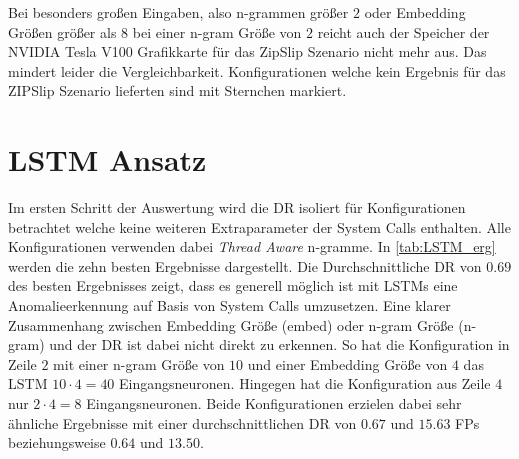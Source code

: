     Bei besonders großen Eingaben, also n-grammen größer $2$ oder Embedding Größen größer als $8$ bei einer n-gram Größe von $2$ reicht auch der Speicher der NVIDIA Tesla V100 Grafikkarte für das ZipSlip Szenario nicht mehr aus.
    Das mindert leider die Vergleichbarkeit.
    Konfigurationen welche kein Ergebnis für das ZIPSlip Szenario lieferten sind mit Sternchen markiert.


    
\section{LSTM Ansatz}\label{sec:erg_LSTM}
    Im ersten Schritt der Auswertung wird die \ac{DR} isoliert für Konfigurationen betrachtet welche keine weiteren Extraparameter der System Calls enthalten.
    Alle Konfigurationen verwenden dabei \textit{Thread Aware} n-gramme.
    In \autoref{tab:LSTM_erg} werden die zehn besten Ergebnisse dargestellt.
    Die Durchschnittliche \ac{DR} von $0.69$ des besten Ergebnisses zeigt, dass es generell möglich ist mit \acp{LSTM} eine Anomalieerkennung auf Basis von System Calls umzusetzen.
    Eine klarer Zusammenhang zwischen Embedding Größe (embed) oder n-gram Größe (n-gram) und der \ac{DR} ist dabei nicht direkt zu erkennen.
    So hat die Konfiguration in Zeile $2$ mit einer n-gram Größe von $10$ und einer Embedding Größe von $4$ das \ac{LSTM} $10 \cdot 4=40$ Eingangsneuronen.
    Hingegen hat die Konfiguration aus Zeile $4$ nur $2 \cdot 4 = 8$ Eingangsneuronen.
    Beide Konfigurationen erzielen dabei sehr ähnliche Ergebnisse mit einer durchschnittlichen \ac{DR} von $0.67$ und $15.63$ \acp{FP} beziehungsweise $0.64$ und $13.50$.


